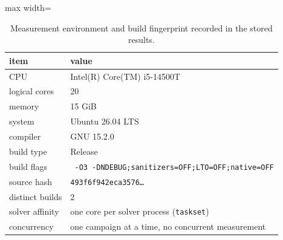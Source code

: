 \begin{table}[tbp]
\centering
\caption{Measurement environment and build fingerprint recorded in the stored results.}
\label{tab:environment}
\small
\begin{adjustbox}{max width=\textwidth}
\begin{tabular}{ll}
\toprule
item & value \\
\midrule
CPU & Intel(R) Core(TM) i5-14500T \\
logical cores & 20 \\
memory & 15 GiB \\
system & Ubuntu 26.04 LTS \\
compiler & GNU 15.2.0 \\
build type & Release \\
build flags & \texttt{ -O3 -DNDEBUG;sanitizers=OFF;LTO=OFF;native=OFF} \\
source hash & \texttt{493f6f942eca3576\ldots} \\
distinct builds & 2 \\
solver affinity & one core per solver process (\texttt{taskset}) \\
concurrency & one campaign at a time, no concurrent measurement \\
\bottomrule
\end{tabular}
\end{adjustbox}
\end{table}
